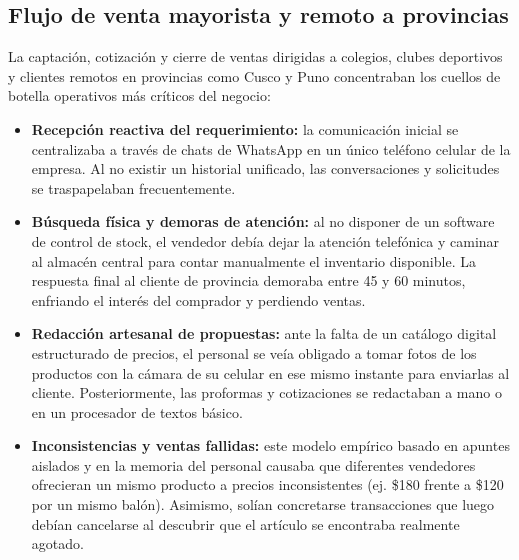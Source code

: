 \subsection{Flujo de venta mayorista y remoto a provincias}
\begin{indentedsubsection}
La captación, cotización y cierre de ventas dirigidas a colegios, clubes deportivos y clientes remotos en provincias como Cusco y Puno concentraban los cuellos de botella operativos más críticos del negocio:

\begin{itemize}
    \item \textbf{Recepción reactiva del requerimiento:} la comunicación inicial se centralizaba a través de chats de WhatsApp en un único teléfono celular de la empresa. Al no existir un historial unificado, las conversaciones y solicitudes se traspapelaban frecuentemente.
    \item \textbf{Búsqueda física y demoras de atención:} al no disponer de un software de control de stock, el vendedor debía dejar la atención telefónica y caminar al almacén central para contar manualmente el inventario disponible. La respuesta final al cliente de provincia demoraba entre 45 y 60 minutos, enfriando el interés del comprador y perdiendo ventas.
    \item \textbf{Redacción artesanal de propuestas:} ante la falta de un catálogo digital estructurado de precios, el personal se veía obligado a tomar fotos de los productos con la cámara de su celular en ese mismo instante para enviarlas al cliente. Posteriormente, las proformas y cotizaciones se redactaban a mano o en un procesador de textos básico.
    \item \textbf{Inconsistencias y ventas fallidas:} este modelo empírico basado en apuntes aislados y en la memoria del personal causaba que diferentes vendedores ofrecieran un mismo producto a precios inconsistentes (ej. \$180 frente a \$120 por un mismo balón). Asimismo, solían concretarse transacciones que luego debían cancelarse al descubrir que el artículo se encontraba realmente agotado.
\end{itemize}
\end{indentedsubsection}

